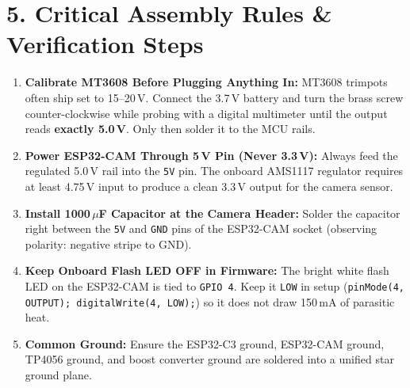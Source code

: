 \documentclass[10pt,a4paper]{article}
\begin{document}
\section{5. Critical Assembly Rules \& Verification Steps}
\begin{enumerate}
    \item \textbf{Calibrate MT3608 Before Plugging Anything In:} MT3608 trimpots often ship set to 15--20\,V. Connect the 3.7\,V battery and turn the brass screw counter-clockwise while probing with a digital multimeter until the output reads \textbf{exactly 5.0\,V}. Only then solder it to the MCU rails.
    \item \textbf{Power ESP32-CAM Through 5\,V Pin (Never 3.3\,V):} Always feed the regulated 5.0\,V rail into the \texttt{5V} pin. The onboard AMS1117 regulator requires at least 4.75\,V input to produce a clean 3.3\,V output for the camera sensor.
    \item \textbf{Install 1000\,$\mu$F Capacitor at the Camera Header:} Solder the capacitor right between the \texttt{5V} and \texttt{GND} pins of the ESP32-CAM socket (observing polarity: negative stripe to GND).
    \item \textbf{Keep Onboard Flash LED OFF in Firmware:} The bright white flash LED on the ESP32-CAM is tied to \texttt{GPIO 4}. Keep it \texttt{LOW} in setup (\texttt{pinMode(4, OUTPUT); digitalWrite(4, LOW);}) so it does not draw 150\,mA of parasitic heat.
    \item \textbf{Common Ground:} Ensure the ESP32-C3 ground, ESP32-CAM ground, TP4056 ground, and boost converter ground are soldered into a unified star ground plane.
\end{enumerate}
\end{document}
